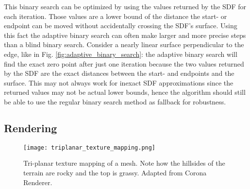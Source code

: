 This binary search can be optimized by using the values returned by the SDF for each iteration. Those values are a lower bound of the distance the start- or endpoint can be moved without accidentally crossing the SDF's surface. Using this fact the adaptive binary search can often make larger and more precise steps than a blind binary search. Consider a nearly linear surface perpendicular to the edge, like in Fig. \ref{fig:adaptive_binary_search}: the adaptive binary search will find the exact zero point after just one iteration because the two values returned by the SDF are the exact distances between the start- and endpoints and the surface. This may not always work for inexact SDF approximations since the returned values may not be actual lower bounds, hence the algorithm should still be able to use the regular binary search method as fallback for robustness.

\subsection{Rendering}
\label{sec:voxel_rendering}

\begin{figure}
\centering
\captionsetup{width=0.8\textwidth}
\texttt{[image: triplanar\_texture\_mapping.png]}
\caption{Tri-planar texture mapping of a mesh. Note how the hillsides of the terrain are rocky and the top is grassy.
Adapted from Corona Renderer\protect\footnotemark.}
\label{fig:triplanar_texture_mapping}
\end{figure}

